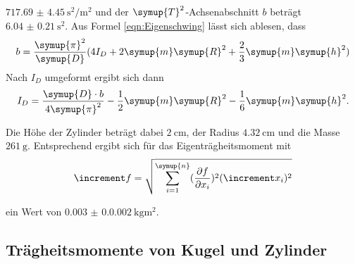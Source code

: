   $\qty{717,69(4.45)}{\second\squared \per \meter\squared}$ und der $\symup{T}^2$-Achsenabschnitt $b$ beträgt $\qty{6,04(0.21)}{\second\squared}$.
  Aus Formel \ref{eqn:Eigenschwing} lässt sich ablesen, dass
  \begin{equation}
    b=\frac{\symup{\pi}^2}{\symup{D}}(4I_D+2\symup{m}\symup{R}^2+\frac{2}{3}\symup{m}\symup{h}^2)
  \end{equation}
  Nach $I_D$ umgeformt ergibt sich dann
  \begin{equation}
    I_D=\frac{\symup{D}\cdot b}{4\symup{\pi}^2}-\frac{1}{2}\symup{m}\symup{R}^2-\frac{1}{6}\symup{m}\symup{h}^2 \text{.}
    \label{eqn:Eigenträgheitsmoment}
  \end{equation}
  
  \noindent Die Höhe der Zylinder beträgt dabei $\qty{2}{\centi\meter}$, der Radius $\qty{4,32}{\centi\meter}$ und die Masse $\qty{261}{\gram}$.
  Entsprechend ergibt sich für das Eigenträgheitsmoment mit 
  \begin{equation}
     \increment f=\sqrt{\sum_{i=1}^{\symup{n}} (\frac{\partial f}{\partial x_i})^2 (\increment x_i)^2}
     \label{eqn:gauß}
  \end{equation}
  
  ein Wert von $\qty{0.003(0.0002)}{\kilo\gram\meter\squared}$.

  \subsection{Trägheitsmomente von Kugel und Zylinder}

